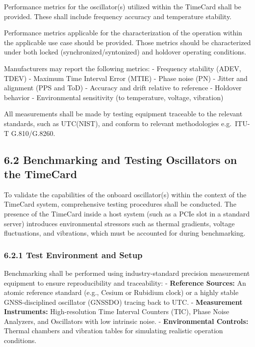 Performance metrics for the oscillator(s) utilized within the TimeCard
shall be provided. These shall include frequency accuracy and
temperature stability.

Performance metrics applicable for the characterization of the operation
within the applicable use case should be provided. Those metrics should
be characterized under both locked (synchronized/syntonized) and
holdover operating conditions.

Manufacturers may report the following metrics: - Frequency stability
(ADEV, TDEV) - Maximum Time Interval Error (MTIE) - Phase noise (PN) -
Jitter and alignment (PPS and ToD) - Accuracy and drift relative to
reference - Holdover behavior - Environmental sensitivity (to
temperature, voltage, vibration)

All measurements shall be made by testing equipment traceable to the
relevant standards, such as UTC(NIST), and conform to relevant
methodologies e.g.~ITU-T G.810/G.8260.

\subsection{6.2 Benchmarking and Testing Oscillators on the
TimeCard}\label{benchmarking-and-testing-oscillators-on-the-timecard}

To validate the capabilities of the onboard oscillator(s) within the
context of the TimeCard system, comprehensive testing procedures shall
be conducted. The presence of the TimeCard inside a host system (such as
a PCIe slot in a standard server) introduces environmental stressors
such as thermal gradients, voltage fluctuations, and vibrations, which
must be accounted for during benchmarking.

\subsubsection{6.2.1 Test Environment and
Setup}\label{test-environment-and-setup}

Benchmarking shall be performed using industry-standard precision
measurement equipment to ensure reproducibility and traceability: -
\textbf{Reference Sources:} An atomic reference standard (e.g., Cesium
or Rubidium clock) or a highly stable GNSS-disciplined oscillator
(GNSSDO) tracing back to UTC. - \textbf{Measurement Instruments:}
High-resolution Time Interval Counters (TIC), Phase Noise Analyzers, and
Oscillators with low intrinsic noise. - \textbf{Environmental Controls:}
Thermal chambers and vibration tables for simulating realistic operation
conditions.

